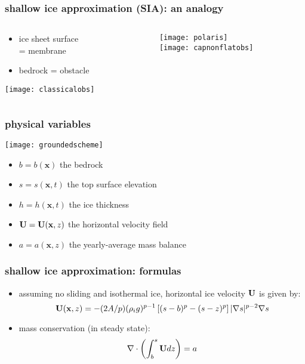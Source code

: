 \documentclass{beamer}
\newcommand{\bx}{\mathbf{x}}
\newcommand{\Div}{\nabla\cdot}
\begin{document}
\begin{frame}
  \frametitle{shallow ice approximation (SIA): an analogy}

\begin{columns}
\begin{column}{0.35\textwidth}
\begin{itemize}
\item ice sheet surface \\ = \alert{membrane}
\item bedrock = \alert{obstacle}
\end{itemize}
\vfill
\begin{center}
\texttt{[image: classicalobs]}
\end{center}
\end{column}
\begin{column}{0.65\textwidth}
\begin{center}
\texttt{[image: polaris]} \\
\texttt{[image: capnonflatobs]}
\end{center}
\end{column}
\end{columns}
\end{frame}


\begin{frame}
  \frametitle{physical variables}

\begin{center}
\texttt{[image: groundedscheme]}
\end{center}

\begin{itemize}
\item $b=b(\bx)$ the bedrock
\item $s=s(\bx,t)$ the top surface elevation
\item $h=h(\bx,t)$ the ice thickness
\item ${\bf U}={\bf U}(\bx,z)$ the horizontal velocity field
\item $a=a(\bx,z)$ the yearly-average mass balance
\end{itemize}
\end{frame}

  
\begin{frame}
  \frametitle{shallow ice approximation: formulas}
 
\begin{itemize}
\item assuming no sliding and isothermal ice, horizontal ice velocity ${\bf U}$ is given by: 
  $${\bf U}(\bx,z)  =  - (2A/p) (\rho_i g)^{p-1}  \left[ (s-b)^p - (s - z)^p  \right] 
|\nabla s |^{p-2} \nabla s$$

\item mass conservation (in steady state): 
  $$\Div \left(  \int_b^s {\bf U} dz \right)  =  a$$

\end{itemize}
\end{frame}
\end{document}
